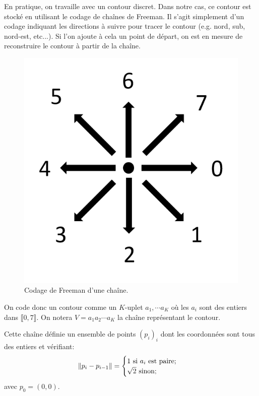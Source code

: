 En pratique, on travaille avec un contour discret. 
Dans notre cas, ce contour est stocké en utilisant le codage 
de chaînes de Freeman.
Il s'agit simplement d'un codage indiquant les directions à suivre 
pour tracer le contour (e.g.\/ nord, sub, nord-est, etc...).
Si l'on ajoute à cela un point de départ, on est en mesure de 
reconstruire le contour à partir de la chaîne.

\begin{figure}[h!]
    \centering
    \includegraphics[scale=0.45]{assets/freeman-chain-encoding}
    \caption{Codage de Freeman d'une chaîne.}
	\label{fig:freeman-chain-encoding}
\end{figure}

On code donc un contour comme un $K$-uplet $a_1, \cdots a_K$ 
où les $a_i$ sont des entiers dans $\llbracket 0, 7 \rrbracket$. 
On notera $V = a_1 a_2 \cdots a_K$ la chaîne représentant le 
contour.

Cette chaîne définie un ensemble de points $(p_i)_i$ 
dont les coordonnées sont tous des entiers et vérifiant:
\[
\left\Vert p_i - p_{i-1}\right\Vert =
\begin{cases}
  1 \text{ si } a_i \text{ est paire;} \\
  \sqrt{2} \text{ sinon;} \\
\end{cases}
\]
avec $p_0 = (0,0)$.


